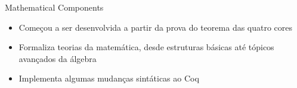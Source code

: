 \begin{frame}{Mathematical Components}
    \begin{itemize}
        \item Começou a ser desenvolvida a partir da prova do teorema das quatro cores
        \item Formaliza teorias da matemática, desde estruturas básicas até tópicos avançados da álgebra \cite{assia_mahboubi_2022_7118596}
        \item Implementa algumas mudanças sintáticas ao Coq
    \end{itemize}
\end{frame}